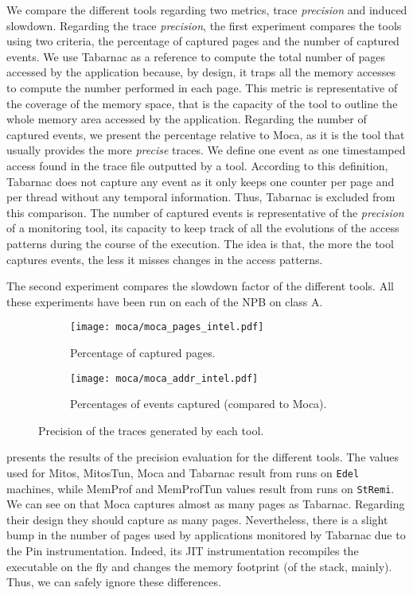 We compare the different tools regarding two metrics, trace \emph{precision} and induced slowdown.
Regarding the trace \emph{precision}, the first experiment compares the tools using two criteria, the percentage of captured pages and the number of captured events.
We use \gls{Tabarnac} as a reference to compute the total number of pages accessed by the application because, by design, it traps all the memory accesses to compute the number performed in each page.
This metric is representative of the coverage of the memory space, that is the capacity of the tool to outline the whole memory area accessed by the application.
Regarding the number of captured events, we present the percentage relative to \gls{Moca}, as it is the tool that usually provides the more \emph{precise} traces.
We define one event as one timestamped access found in the trace file outputted by a tool.
According to this definition, \gls{Tabarnac} does not capture any event as it only keeps one counter per page and per thread without any temporal information.
Thus, \gls{Tabarnac} is excluded from this comparison.
The number of captured events is representative of the \emph{precision} of a monitoring tool, its capacity to keep track of all the evolutions of the access patterns during the course of the execution.
The idea is that, the more the tool captures events, the less it misses changes in the access patterns.

The second experiment compares the slowdown factor of the different tools.
All these experiments have been run on each of the \gls{NPB} on class A.

\begin{figure}[htb]
    \centering
    \begin{subfigure}{.73\linewidth}
        \texttt{[image: moca/moca\_pages\_intel.pdf]}
        \caption{Percentage of captured pages.}
        \label{fig:pages}
    \end{subfigure}
    \begin{subfigure}{.73\linewidth}
        \texttt{[image: moca/moca\_addr\_intel.pdf]}
        \caption{Percentages of events captured (compared to \gls{Moca}).}
        \label{fig:addr}
    \end{subfigure}
    \caption{Precision of the traces generated by each tool.}
    \label{fig:pages-addr}
\end{figure}

 presents the results of the precision evaluation for the different tools.
The values used for \gls{Mitos}, MitosTun, \gls{Moca} and \gls{Tabarnac} result from runs on \texttt{Edel} machines, while \gls{MemProf} and MemProfTun values result from runs on \texttt{StRemi}.
We can see on  that \gls{Moca} captures almost as many pages as \gls{Tabarnac}.
Regarding their design they should capture as many pages.
Nevertheless, there is a slight bump in the number of pages used by applications monitored by \gls{Tabarnac} due to the Pin instrumentation.
Indeed, its JIT instrumentation recompiles the executable on the fly and changes the memory footprint (of the stack, mainly).
Thus, we can safely ignore these differences.

